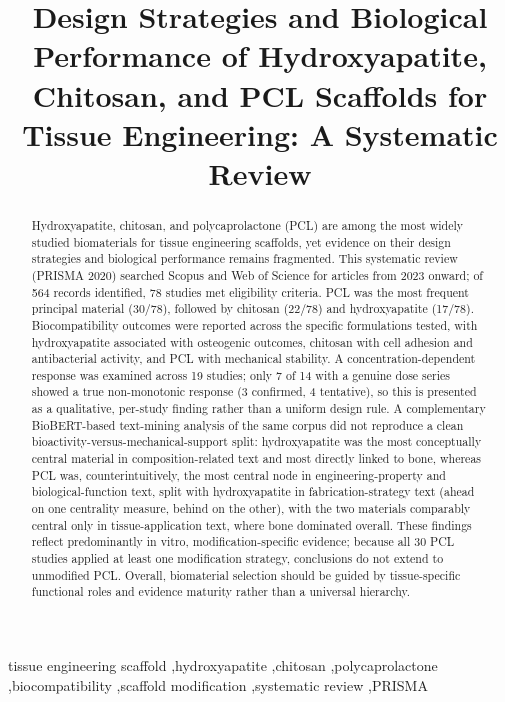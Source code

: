 \documentclass[5p,times,twocolumn]{elsarticle}
\begin{document}
\begin{frontmatter}

\title{Design Strategies and Biological Performance of Hydroxyapatite, Chitosan, and PCL Scaffolds for Tissue Engineering: A Systematic Review}

\begin{abstract}
Hydroxyapatite, chitosan, and polycaprolactone (PCL) are among the most widely studied biomaterials for tissue engineering scaffolds, yet evidence on their design strategies and biological performance remains fragmented. This systematic review (PRISMA 2020) searched Scopus and Web of Science for articles from 2023 onward; of 564 records identified, 78 studies met eligibility criteria. PCL was the most frequent principal material (30/78), followed by chitosan (22/78) and hydroxyapatite (17/78). Biocompatibility outcomes were reported across the specific formulations tested, with hydroxyapatite associated with osteogenic outcomes, chitosan with cell adhesion and antibacterial activity, and PCL with mechanical stability. A concentration-dependent response was examined across 19 studies; only 7 of 14 with a genuine dose series showed a true non-monotonic response (3 confirmed, 4 tentative), so this is presented as a qualitative, per-study finding rather than a uniform design rule. A complementary BioBERT-based text-mining analysis of the same corpus did not reproduce a clean bioactivity-versus-mechanical-support split: hydroxyapatite was the most conceptually central material in composition-related text and most directly linked to bone, whereas PCL was, counterintuitively, the most central node in engineering-property and biological-function text, split with hydroxyapatite in fabrication-strategy text (ahead on one centrality measure, behind on the other), with the two materials comparably central only in tissue-application text, where bone dominated overall. These findings reflect predominantly in vitro, modification-specific evidence; because all 30 PCL studies applied at least one modification strategy, conclusions do not extend to unmodified PCL. Overall, biomaterial selection should be guided by tissue-specific functional roles and evidence maturity rather than a universal hierarchy.
\end{abstract}

\begin{keyword}
tissue engineering scaffold \sep hydroxyapatite \sep chitosan \sep polycaprolactone \sep biocompatibility \sep scaffold modification \sep systematic review \sep PRISMA
\end{keyword}

\end{frontmatter}
\end{document}
